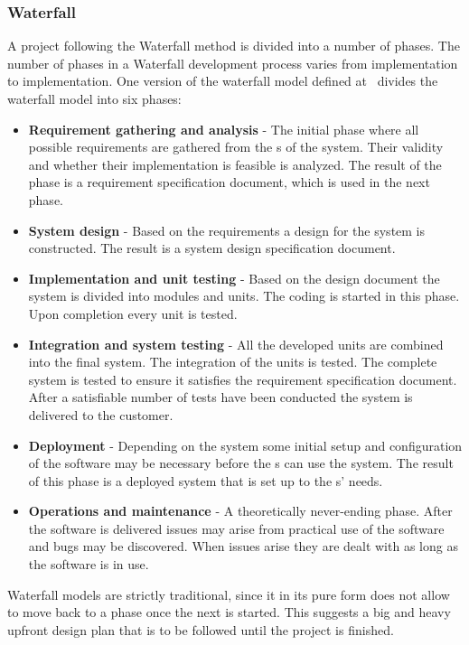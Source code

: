 \subsubsection{Waterfall}
A project following the Waterfall method is divided into a number of phases.
The number of phases in a Waterfall development process varies from implementation to implementation.
One version of the waterfall model defined at~\cite{Parekh11} divides the waterfall model into six phases:

\begin{itemize}
	\item \textbf{Requirement gathering and analysis} - The initial phase where all possible requirements are gathered from the \euser{}s of the system.
	Their validity and whether their implementation is feasible is analyzed.
	The result of the phase is a requirement specification document, which is used in the next phase.
	\item \textbf{System design} - Based on the requirements a design for the system is constructed. 
	The result is a system design specification document.
	\item \textbf{Implementation and unit testing} - Based on the design document the system is divided into modules and units. 
	The coding is started in this phase. 
	Upon completion every unit is tested.
	\item \textbf{Integration and system testing} - All the developed units are combined into the final system. 
	The integration of the units is tested.
	The complete system is tested to ensure it satisfies the requirement specification document.
	After a satisfiable number of tests have been conducted the system is delivered to the customer.
	\item \textbf{Deployment} - Depending on the system some initial setup and configuration of the software may be necessary before the \euser{}s can use the system. 
	The result of this phase is a deployed system that is set up to the \euser{}s' needs.
	\item \textbf{Operations and maintenance} - A theoretically never-ending phase. 
	After the software is delivered issues may arise from practical use of the software and bugs may be discovered. 
	When issues arise they are dealt with as long as the software is in use.
\end{itemize}

Waterfall models are strictly traditional, since it in its pure form does not allow to move back to a phase once the next is started.
This suggests a big and heavy upfront design plan that is to be followed until the project is finished.

